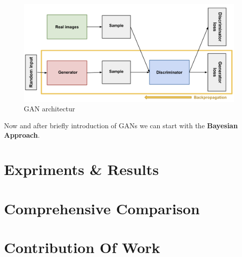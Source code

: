 \begin{figure}
  \centering
  \label{fig:gan_architectur}
  \includegraphics[width=1\textwidth]{fig/gan_architectur}
  \caption{GAN architectur \cite{TODO-google-reference}}
\end{figure}



Now and after briefly introduction of GANs we can start with the \textbf{Bayesian Approach}.

\label{tit:manifold-approach}

\chapter{Expriments \& Results}

\chapter{Comprehensive Comparison}

\chapter{Contribution Of Work}